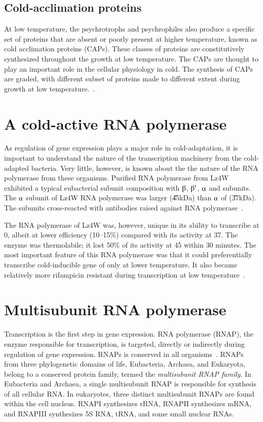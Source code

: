 \subsection{Cold-acclimation proteins}

At low temperature, the psychrotrophs and psychrophiles also
produce a specific set of proteins that are absent or poorly
present at higher temperature, known as cold acclimation proteins
(CAPs). These classes of proteins are  constitutively synthesized
throughout the growth at low temperature. The CAPs are thought to
play an important role in the cellular physiology in cold. The
synthesis of CAPs are graded, with different subset of proteins
made to different extent during growth at low
temperature.~\citep{Hebraud1999}.

\section{A cold-active RNA polymerase}

As regulation of gene expression plays a major role in
cold-adaptation, it is important to understand the nature of the
transcription machinery from the cold-adapted bacteria. Very
little, however, is known about the the nature of the RNA
polymerase from these organisms. Purified RNA polymerase from Lz4W
exhibited a typical eubacterial subunit composition with
$\betaup$, $\betaup'$, $\alphaup$ and \s{} subunits. The
$\alphaup$ subunit of Lz4W RNA polymerase was larger (\U{45}{kDa})
than $\alphaup$ of  (\U{37}{kDa}). The subunits
cross-reacted with antibodies raised against  RNA
polymerase~\citep{Uma1999}.

The RNA polymerase of Lz4W was, however, unique in its ability to
transcribe at 0\dg{}, albeit at lower efficiency (10--15\%)
compared with its activity at 37\dg{}\@. The enzyme was
thermolabile; it lost 50\% of its activity at 45\dg{} within 30
minutes. The most important feature of this RNA polymerase was
that it could preferentially transcribe cold-inducible 
gene of  only at lower temperature. It also became
relatively more rifampicin resistant during transcription at low
temperature~\citep{Uma1999}.


\section{Multisubunit RNA polymerase}

Transcription is the first step in gene expression. RNA polymerase
(RNAP), the enzyme responsible for transcription, is targeted,
directly or indirectly during regulation of gene expression. RNAPs
is conserved in all organisms~\citep{Ebright2000,Young1991}. RNAPs
from three phylogenetic domains of life, Eubacteria, Archaea, and
Eukaryota, belong to a conserved protein family, termed the
\emph{multisubunit RNAP family}. In Eubacteria and Archaea, a
single multisubunit RNAP is responsible for synthesis of all
cellular RNA. In eukaryotes, three distinct multisubunit RNAPs are
found within the cell nucleus. RNAPI synthesizes rRNA, RNAPII
synthesizes mRNA, and RNAPIII synthesizes 5S RNA, tRNA, and some
small nuclear RNAs.

